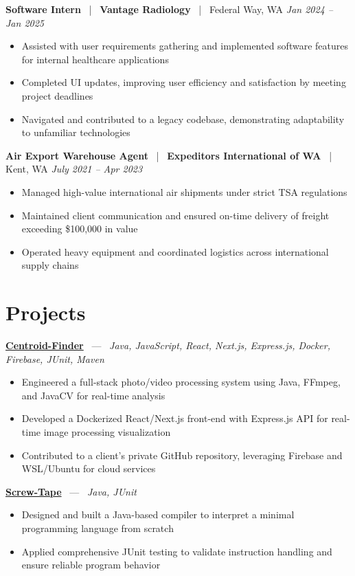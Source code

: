 \documentclass[10pt, letterpaper]{article}
\newcommand{\jobhead}[4]{%
  \vspace{5pt}%
  {\bfseries\color{dark}#1}%
  ~{\color{light}|}~%
  {\bfseries\color{navy}#2}%
  ~{\color{light}|}~%
  {\color{light}#3}%
  \hfill{\color{light}\small\textit{#4}}\\[-2pt]%
}
\newcommand{\projhead}[3]{%
  \vspace{5pt}%
  {\bfseries\color{dark}\href{#2}{#1}}%
  ~{\color{light}---}~%
  {\color{light}\small\textit{#3}}\\[-2pt]%
}
\begin{document}
\jobhead{Software Intern}{Vantage Radiology}{Federal Way, WA}{Jan 2024 – Jan 2025}
\begin{itemize}
  \item Assisted with user requirements gathering and implemented software features for internal healthcare applications
  \item Completed UI updates, improving user efficiency and satisfaction by meeting project deadlines
  \item Navigated and contributed to a legacy codebase, demonstrating adaptability to unfamiliar technologies
\end{itemize}

\jobhead{Air Export Warehouse Agent}{Expeditors International of WA}{Kent, WA}{July 2021 – Apr 2023}
\begin{itemize}
  \item Managed high-value international air shipments under strict TSA regulations
  \item Maintained client communication and ensured on-time delivery of freight exceeding \$100,000 in value
  \item Operated heavy equipment and coordinated logistics across international supply chains
\end{itemize}

\section{Projects}

\projhead{Centroid-Finder}{https://github.com/xavierb117/centroid-finder}{Java, JavaScript, React, Next.js, Express.js, Docker, Firebase, JUnit, Maven}
\begin{itemize}
  \item Engineered a full-stack photo/video processing system using Java, FFmpeg, and JavaCV for real-time analysis
  \item Developed a Dockerized React/Next.js front-end with Express.js API for real-time image processing visualization
  \item Contributed to a client's private GitHub repository, leveraging Firebase and WSL/Ubuntu for cloud services
\end{itemize}

\projhead{Screw-Tape}{https://github.com/timmyd4/screwtape}{Java, JUnit}
\begin{itemize}
  \item Designed and built a Java-based compiler to interpret a minimal programming language from scratch
  \item Applied comprehensive JUnit testing to validate instruction handling and ensure reliable program behavior
\end{itemize}
\end{document}
